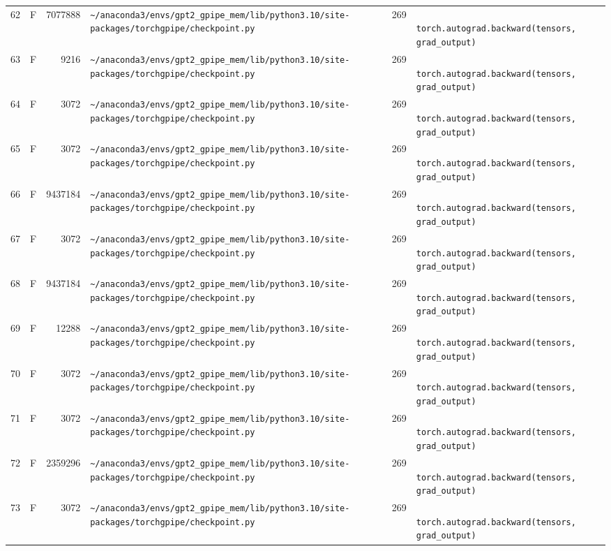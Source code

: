 \documentclass{article}
\begin{document}
\begin{longtable}{r l r p{6.5cm} r p{7.0cm}}
62 & F & 7077888 & \lstinline|~/anaconda3/envs/gpt2_gpipe_mem/lib/python3.10/site-packages/torchgpipe/checkpoint.py| & 269 & \lstinline|            torch.autograd.backward(tensors, grad_output)| \\
63 & F & 9216 & \lstinline|~/anaconda3/envs/gpt2_gpipe_mem/lib/python3.10/site-packages/torchgpipe/checkpoint.py| & 269 & \lstinline|            torch.autograd.backward(tensors, grad_output)| \\
64 & F & 3072 & \lstinline|~/anaconda3/envs/gpt2_gpipe_mem/lib/python3.10/site-packages/torchgpipe/checkpoint.py| & 269 & \lstinline|            torch.autograd.backward(tensors, grad_output)| \\
65 & F & 3072 & \lstinline|~/anaconda3/envs/gpt2_gpipe_mem/lib/python3.10/site-packages/torchgpipe/checkpoint.py| & 269 & \lstinline|            torch.autograd.backward(tensors, grad_output)| \\
66 & F & 9437184 & \lstinline|~/anaconda3/envs/gpt2_gpipe_mem/lib/python3.10/site-packages/torchgpipe/checkpoint.py| & 269 & \lstinline|            torch.autograd.backward(tensors, grad_output)| \\
67 & F & 3072 & \lstinline|~/anaconda3/envs/gpt2_gpipe_mem/lib/python3.10/site-packages/torchgpipe/checkpoint.py| & 269 & \lstinline|            torch.autograd.backward(tensors, grad_output)| \\
68 & F & 9437184 & \lstinline|~/anaconda3/envs/gpt2_gpipe_mem/lib/python3.10/site-packages/torchgpipe/checkpoint.py| & 269 & \lstinline|            torch.autograd.backward(tensors, grad_output)| \\
69 & F & 12288 & \lstinline|~/anaconda3/envs/gpt2_gpipe_mem/lib/python3.10/site-packages/torchgpipe/checkpoint.py| & 269 & \lstinline|            torch.autograd.backward(tensors, grad_output)| \\
70 & F & 3072 & \lstinline|~/anaconda3/envs/gpt2_gpipe_mem/lib/python3.10/site-packages/torchgpipe/checkpoint.py| & 269 & \lstinline|            torch.autograd.backward(tensors, grad_output)| \\
71 & F & 3072 & \lstinline|~/anaconda3/envs/gpt2_gpipe_mem/lib/python3.10/site-packages/torchgpipe/checkpoint.py| & 269 & \lstinline|            torch.autograd.backward(tensors, grad_output)| \\
72 & F & 2359296 & \lstinline|~/anaconda3/envs/gpt2_gpipe_mem/lib/python3.10/site-packages/torchgpipe/checkpoint.py| & 269 & \lstinline|            torch.autograd.backward(tensors, grad_output)| \\
73 & F & 3072 & \lstinline|~/anaconda3/envs/gpt2_gpipe_mem/lib/python3.10/site-packages/torchgpipe/checkpoint.py| & 269 & \lstinline|            torch.autograd.backward(tensors, grad_output)| \\

\end{longtable}
\end{document}

